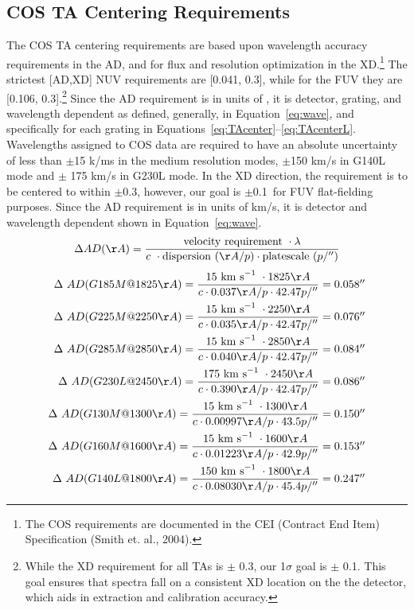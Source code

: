 \subsection{COS TA Centering Requirements}\label{subsec:requirements}

The COS TA centering requirements are based upon wavelength accuracy requirements in the AD, and for flux and resolution optimization
in the XD.\footnote{The COS requirements are documented in the CEI (Contract End Item) Specification (Smith et. al., 2004).}
The strictest [AD,XD] NUV requirements are [0.041, 0.3]\arcsec, while for the FUV they are [0.106, 0.3]\arcsec.\footnote{While the XD requirement for all TAs is $\pm$ 0.3\arcsec, our 1$\sigma$ goal is $\pm$ 0.1\arcsec. This goal ensures that spectra fall on a consistent XD location on the the detector, which aids in extraction and calibration accuracy.}
Since the AD requirement is in units of \kmsno, it is detector, grating, and wavelength dependent as defined, generally, in Equation~\ref{eq:wave}, and specifically
for each grating in Equations~\ref{eq:TAcenter}--\ref{eq:TAcenterL}.
Wavelengths assigned to COS data are required to have an absolute uncertainty of less than $\pm$15 k/ms in the medium resolution modes, $\pm$150 km/s in G140L mode and $\pm$ 175 km/s in G230L mode.
In the XD direction, the requirement is to be centered to within $\pm$0.3\arcsec, however, our goal is $\pm$0.1\arcsec\ for FUV flat-fielding purposes.
Since the AD requirement is in units of km/s, it is detector and wavelength dependent shown in Equation~\ref{eq:wave}.\\
\begin{equation}
\Delta AD (\AA) ={ {{\rm velocity\ requirement}\ \cdot \lambda}\over{ c~\cdot {\rm dispersion}\ (\AA/p) \cdot {\rm platescale}\ (p/\arcsec)}}
\label{eq:wave}
\end{equation}
\begin{eqnarray}\label{eq:TAcenter}
\setlength\itemsep{0.1em}
\Delta\ AD(G185M@1825\AA) = {{ 15\kms \cdot 1825\AA}\over{c \cdot 0 .037\AA/p\cdot 42.47 p/\arcsec}}  = 0.058\arcsec\\
\Delta\ AD(G225M@2250\AA) = {{ 15\kms \cdot 2250\AA}\over{c \cdot  0.035\AA/p\cdot 42.47 p/\arcsec}}  = 0.076\arcsec\\
\Delta\ AD(G285M@2850\AA) = {{ 15\kms \cdot 2850\AA}\over{c \cdot  0.040\AA/p\cdot 42.47 p/\arcsec}}  = 0.084\arcsec\\
\Delta\ AD(G230L@2450\AA) = {{175\kms \cdot 2450\AA}\over{c \cdot  0.390\AA/p\cdot 42.47 p/\arcsec}}  = 0.086\arcsec\\
\Delta\ AD(G130M@1300\AA) = {{ 15\kms \cdot 1300\AA}\over{c \cdot 0.00997\AA/ p\cdot 43.5 p/\arcsec}} = 0.150\arcsec\\
\Delta\ AD(G160M@1600\AA) = {{ 15\kms \cdot 1600\AA}\over{c \cdot 0.01223\AA/ p\cdot 42.9 p/\arcsec}} = 0.153\arcsec\\
\Delta\ AD(G140L@1800\AA) = {{150\kms \cdot 1800\AA}\over{c \cdot 0.08030\AA/ p\cdot 45.4 p/\arcsec}} = 0.247\arcsec\label{eq:TAcenterL}
\end{eqnarray}
\normalsize

